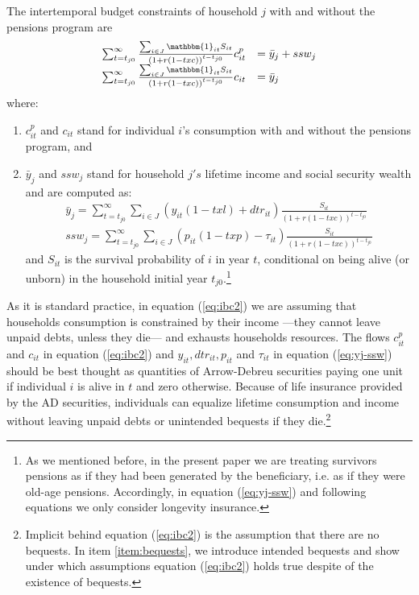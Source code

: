 \documentclass{article}
\begin{document}
\begin{enumerate}
  The intertemporal budget constraints of household $j$ with and without the pensions program are
   \begin{equation} \label{eq:ibc2}
    \begin{array}{ll}
         \sum_{t=t_{j0}}^\infty \frac{\sum_{i\in J} \mathbbm{1}_{it} S_{it}}{(1+r(1-txc))^{t-t_{j0}}} c_{it}^p & = \bar y_j + ssw_j \\
         \sum_{t=t_{j0}}^\infty \frac{\sum_{i\in J} \mathbbm{1}_{it} S_{it}}{(1+r(1-txc))^{t-t_{j0}}} c_{it} & = \bar y_j   
    \end{array}
  \end{equation}
     where: 
     \begin{enumerate}
         \item $c_{it}^p$ and $c_{it}$ stand for individual $i$'s consumption with and without the pensions program, and
         \item $\bar y_j$ and $ssw_j$ stand for household $j's$ lifetime income and social security wealth and are computed as:
     \begin{equation} \label{eq:yj-ssw}
        \begin{array}{ll}
            \bar y_j = \sum_{t=t_{j0}}^\infty \sum_{i\in J} (y_{it}(1-txl)+dtr_{it}) \frac{S_{it}}{(1+r(1-txc))^{t-t_{j0}}} \\
            ssw_j = \sum_{t=t_{j0}}^\infty \sum_{i\in J} (p_{it}(1-txp)-\tau_{it}) \frac{S_{it}}{(1+r(1-txc))^{t-t_{j0}}} 
        \end{array}
    \end{equation}
    and $S_{it}$ is the survival probability of $i$ in year $t$, conditional on being alive (or unborn) in the household initial year $t_{j0}$.\footnote{As we mentioned before, in the present paper we are treating survivors pensions as if they had been generated by the beneficiary, i.e. as if they were old-age pensions. Accordingly, in equation (\ref{eq:yj-ssw}) and following equations we only consider longevity insurance. }
     \end{enumerate}
       
     
    As it is standard practice, in equation (\ref{eq:ibc2}) we are assuming that households consumption is constrained by their income ---they cannot leave unpaid debts, unless they die--- and exhausts households resources. The flows $c_{it}^p$ and $c_{it}$ in equation (\ref{eq:ibc2}) and  $y_{it}, dtr_{it}, p_{it}$ and $\tau_{it}$ in equation (\ref{eq:yj-ssw}) should be best thought as quantities of Arrow-Debreu securities paying one unit if individual $i$ is alive in $t$ and zero otherwise. Because of life insurance provided by the AD securities, individuals can equalize lifetime consumption and income without leaving unpaid debts or unintended bequests if they die.\footnote{Implicit behind equation (\ref{eq:ibc2}) is the assumption that there are no bequests. In item \ref{item:bequests}, we introduce intended bequests and show under which assumptions equation (\ref{eq:ibc2}) holds true despite of the existence of bequests.}
    

\end{enumerate}
\end{document}
